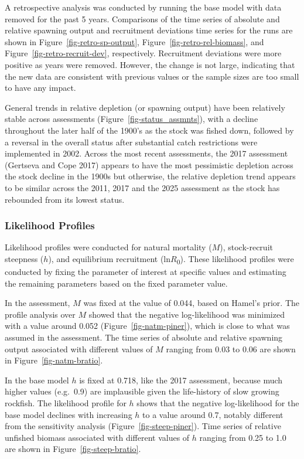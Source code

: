\documentclass[
]{scrartcl}
\begin{document}
A retrospective analysis was conducted by running the base model with
data removed for the past 5 years. Comparisons of the time series of
absolute and relative spawning output and recruitment deviations time
series for the runs are shown in Figure~\ref{fig-retro-sp-output},
Figure~\ref{fig-retro-rel-biomass}, and
Figure~\ref{fig-retro-recruit-dev}, respectively. Recruitment deviations
were more positive as years were removed. However, the change is not
large, indicating that the new data are consistent with previous values
or the sample sizes are too small to have any impact.

General trends in relative depletion (or spawning output) have been
relatively stable across assessments (Figure~\ref{fig-status_assmnts}),
with a decline throughout the later half of the 1900's as the stock was
fished down, followed by a reversal in the overall status after
substantial catch restrictions were implemented in 2002. Across the most
recent assessments, the 2017 assessment (Gertseva and Cope 2017) appears
to have the most pessimistic depletion across the stock decline in the
1900s but otherwise, the relative depletion trend appears to be similar
across the 2011, 2017 and the 2025 assessment as the stock has rebounded
from its lowest status.

\subsubsection{Likelihood Profiles}\label{likelihood-profiles}

Likelihood profiles were conducted for natural mortality (\(M\)),
stock-recruit steepness (\(h\)), and equilibrium recruitment
(ln\(R\)\textsubscript{0}). These likelihood profiles were conducted by
fixing the parameter of interest at specific values and estimating the
remaining parameters based on the fixed parameter value.

In the assessment, \(M\) was fixed at the value of 0.044, based on
Hamel's prior. The profile analysis over \(M\) showed that the negative
log-likelihood was minimized with a value around 0.052
(Figure~\ref{fig-natm-piner}), which is close to what was assumed in the
assessment. The time series of absolute and relative spawning output
associated with different values of \(M\) ranging from 0.03 to 0.06 are
shown in Figure~\ref{fig-natm-bratio}.

In the base model \(h\) is fixed at 0.718, like the 2017 assessment,
because much higher values (e.g.~0.9) are implausible given the
life-history of slow growing rockfish. The likelihood profile for \(h\)
shows that the negative log-likelihood for the base model declines with
increasing \(h\) to a value around 0.7, notably different from the
sensitivity analysis (Figure~\ref{fig-steep-piner}). Time series of
relative unfished biomass associated with different values of \(h\)
ranging from 0.25 to 1.0 are shown in Figure~\ref{fig-steep-bratio}.
\end{document}

